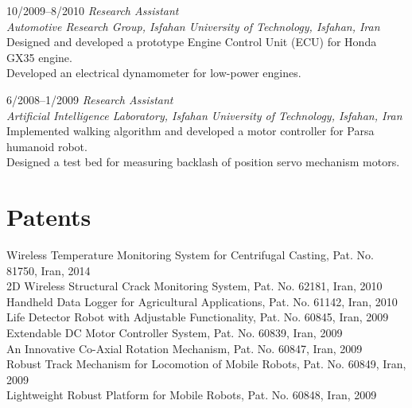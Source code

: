 \documentclass[10pt]{article}
\newlength{\Vspace}
\newlength{\Vspace}
\begin{document}
\begin{CV}
\item[10/2009--8/2010] \textit{Research Assistant} \\
    \textit{Automotive Research Group, Isfahan University of Technology, Isfahan, Iran}\vspace{\Vspace} \\
    Designed and developed a prototype Engine Control Unit (ECU) for Honda GX35 engine. \\
    Developed an electrical dynamometer for low-power engines.

\item[6/2008--1/2009] \textit{Research Assistant} \\
    \textit{Artificial Intelligence Laboratory, Isfahan University of Technology, Isfahan, Iran}\vspace{\Vspace} \\
    Implemented walking algorithm and developed a motor controller for Parsa humanoid robot. \\
    Designed a test bed for measuring backlash of position servo mechanism motors.

\end{CV}

\section{Patents}

\begin{flushleft}

Wireless Temperature Monitoring System for Centrifugal Casting, Pat. No. 81750, Iran, 2014 \vspace{\Vspace} \\
2D Wireless Structural Crack Monitoring System, Pat. No. 62181, Iran, 2010 \vspace{\Vspace} \\
Handheld Data Logger for Agricultural Applications, Pat. No. 61142, Iran, 2010 \vspace{\Vspace} \\
Life Detector Robot with Adjustable Functionality, Pat. No. 60845, Iran, 2009 \vspace{\Vspace} \\
Extendable DC Motor Controller System, Pat. No. 60839, Iran, 2009 \vspace{\Vspace} \\
An Innovative Co-Axial Rotation Mechanism, Pat. No. 60847, Iran, 2009 \vspace{\Vspace} \\
Robust Track Mechanism for Locomotion of Mobile Robots, Pat. No. 60849, Iran, 2009 \vspace{\Vspace} \\
Lightweight Robust Platform for Mobile Robots, Pat. No. 60848, Iran, 2009

\end{flushleft}
\end{document}

